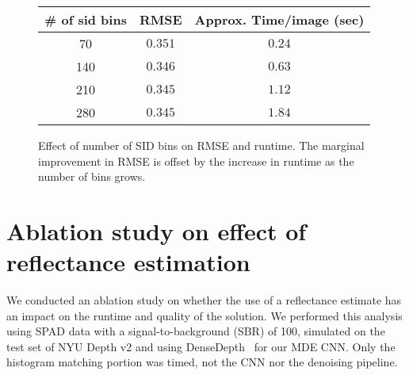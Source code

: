 \documentclass[runningheads]{llncs}
\begin{document}
\begin{figure}[H]
  \centering
  \begin{tabular}{c|cc}
    \toprule
    \# of sid bins & RMSE & Approx. Time/image (sec) \\
    \midrule
    70  & $0.351$ & $0.24$ \\
    140 & $0.346$ & $0.63$ \\
    210 & $0.345$ & $1.12$ \\
    280 & $0.345$ & $1.84$ \\
    \bottomrule
  \end{tabular}
  \caption{Effect of number of SID bins on RMSE and runtime. The marginal
    improvement in RMSE is offset by the increase in runtime as the number of
    bins grows.}
  \label{fig:sid_ablation}
\end{figure}


\section{Ablation study on effect of reflectance estimation}
We conducted an ablation study on whether the use of a reflectance
estimate has an impact on the runtime and quality of the solution.
We performed this analysis using SPAD
data with a signal-to-background (SBR) of 100, simulated on the test set of NYU
Depth v2 and using DenseDepth~\cite{Alhashim2018} for our MDE CNN.
Only the histogram matching portion was timed, not the CNN nor the denoising pipeline.
\end{document}
